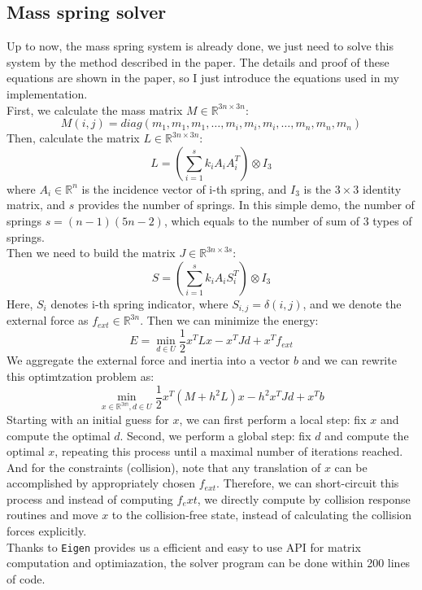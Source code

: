 \documentclass[acmtog]{acmart}
\begin{document}
\subsection{Mass spring solver}
Up to now, the mass spring system is already done, we just need to solve this system by the 
method described in the paper. The details and proof of these equations are shown in the paper, 
so I just introduce the equations used in my implementation.\\
First, we calculate the mass matrix $M \in \mathbb{R}^{3n\times 3n}$:
$$M(i, j) = diag(m_1, m_1, m_1, \ldots, m_i, m_i, m_i, \ldots, m_n, m_n, m_n)$$
Then, calculate the matrix $L\in \mathbb{R}^{3n\times 3n}$:
$$L = (\sum_{i=1}^{s}k_iA_iA_i^T)\otimes I_3$$
where $A_i \in \mathbb{R}^n$ is the incidence vector of i-th spring, and $I_3$ is the $3\times3$ 
identity matrix, and $s$ provides the number of springs. In this simple demo, the number of springs
$s = (n-1)(5n-2)$, which equals to the number of sum of 3 types of springs.\\
Then we need to build the matrix $J\in \mathbb{R}^{3n\times 3s}$: 
$$S = (\sum_{i=1}^{s}k_iA_iS_i^T)\otimes I_3$$
Here, $S_i$ denotes i-th spring indicator, where $S_{i,j} = \delta(i, j)$, and we denote the 
external force as $f_{ext} \in \mathbb{R}^{3n}$. Then we can minimize the energy:
$$E = \min_{d \in U}\frac{1}{2}x^TLx - x^TJd + x^T f_{ext}$$
We aggregate the external force and inertia into a vector $b$ and we can rewrite this 
optimtzation problem as:
$$\min_{x\in\mathbb{R^{3m}}, d \in U}\frac{1}{2}x^T(M+h^2L)x - h^2x^TJd + x^T b$$
Starting with an initial guess for $x$, we can first perform a local step: 
fix $x$ and compute the optimal $d$. Second, we perform a global step: fix $d$ and 
compute the optimal $x$, repeating this process until a maximal number of iterations
reached.\\ 
And for the constraints (collision), note that any translation of $x$ can be accomplished 
by appropriately chosen $f_{ext}$. Therefore, we can short-circuit this process and instead of 
computing $f_ext$, we directly compute by collision response routines and move $x$ to the 
collision-free state, instead of calculating the collision forces explicitly.\\
Thanks to \texttt{Eigen} provides us a efficient and easy to use API for matrix computation 
and optimiazation, the solver program can be done within 200 lines of code.\\
\end{document}
